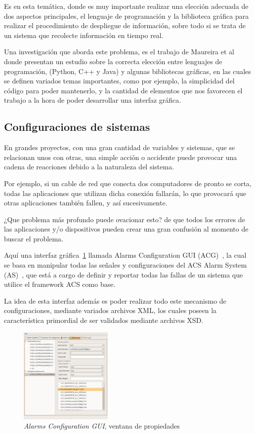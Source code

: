 Es en esta temática, donde es muy importante realizar una elección adecuada de
dos aspectos principales, el lenguaje de programación y la biblioteca
gráfica para realizar el procedimiento de despliegue de información,
sobre todo si se trata de un sistema que recolecte información
en tiempo real.

Una investigación que aborda este problema, es el trabajo de Maureira et al~\cite{hpg}
donde presentan un estudio sobre la correcta elección entre lenguajes de programación,
(Python, C++ y Java) y algunas bibliotecas gráficas, en las cuales se definen variados
temas importantes, como por ejemplo, la simplicidad del código para poder mantenerlo,
y la cantidad de elementos que nos favorecen el trabajo a la hora de poder desarrollar
una interfaz gráfica.

\subsection{Configuraciones de sistemas}

En grandes proyectos, con una gran cantidad de variables y sistemas, que se relacionan
unos con otras, una simple acción o accidente puede provocar una cadena de reacciones
debido a la naturaleza del sistema.

Por ejemplo, si un cable de red que conecta dos computadores de pronto se corta,
todas las aplicaciones que utilizan dicha conexión fallarán, lo que provocará
que otras aplicaciones también fallen, y así sucesivamente.

¿Que problema más profundo puede ovacionar esto?
de que todos los errores de las aplicaciones y/o dispositivos pueden crear
una gran confusión al momento de buscar el problema.

Aquí una interfaz gráfica~\ref{fig:acg} llamada Alarms Configuration GUI (ACG)~\cite{acg},
la cual se basa en manipular todas las señales y configuraciones del ACS Alarm System (AS)~\cite{as},
que está a cargo de definir y reportar todas las fallas de un sistema que utilice
el framework ACS como base.

La idea de esta interfaz además es poder realizar todo este mecanismo de configuraciones,
mediante variados archivos XML, los cuales poseen la característica primordial de ser
validados mediante archivos XSD.

\begin{figure}[!htb]
    \centering
    \includegraphics[width=0.4\textwidth]{img/acg}
    \caption{\emph{Alarms Configuration GUI}, ventana de propiedades}
    \label{fig:acg}
\end{figure}


